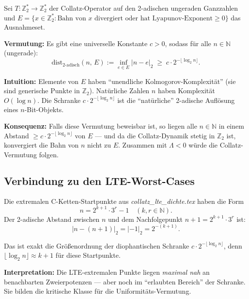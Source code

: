 \documentclass[12pt,a4paper]{article}
\newcommand{\N}{\mathbb{N}}
\newcommand{\Ztwo}{\mathbb{Z}_2}
\begin{document}
\begin{tcolorbox}[konj, title={Uniformitäts-Vermutung (Hauptvermutung dieses Dokuments)}]
Sei $T: \Ztwo^* \to \Ztwo^*$ der Collatz-Operator auf den 2-adischen
ungeraden Ganzzahlen und $E = \{x \in \Ztwo^* : \text{Bahn von } x
\text{ divergiert oder hat Lyapunov-Exponent} \geq 0\}$ das Ausnahmeset.

\medskip
\textbf{Vermutung:} Es gibt eine universelle Konstante $c > 0$, sodass
für alle $n \in \N$ (ungerade):
\[
  \mathrm{dist}_{2\text{-adisch}}(n,\, E)
  := \inf_{e \in E} |n - e|_2
  \;\geq\; c \cdot 2^{-\lfloor\log_2 n\rfloor}.
\]

\medskip
\textbf{Intuition:} Elemente von $E$ haben ``unendliche Kolmogorov-Komplexität''
(sie sind generische Punkte in $\Ztwo$). Natürliche Zahlen $n$ haben
Komplexität $O(\log n)$. Die Schranke $c \cdot 2^{-\lfloor\log_2 n\rfloor}$
ist die ``natürliche'' 2-adische Auflösung eines $n$-Bit-Objekts.

\medskip
\textbf{Konsequenz:} Falls diese Vermutung beweisbar ist, so liegen alle
$n \in \N$ in einem Abstand $\geq c \cdot 2^{-\lfloor\log_2 n\rfloor}$
von $E$ --- und da die Collatz-Dynamik stetig in $\Ztwo$ ist, konvergiert
die Bahn von $n$ nicht zu $E$. Zusammen mit $\Lambda < 0$ würde die
Collatz-Vermutung folgen.
\end{tcolorbox}

\subsection{Verbindung zu den LTE-Worst-Cases}

\begin{tcolorbox}[dynfeld, title={LTE-Extremalpunkte und die diophantische Schranke}]
Die extremalen C-Ketten-Startpunkte aus \textit{collatz\_lte\_dichte.tex}
haben die Form
\[
  n = 2^{k+1} \cdot 3^r - 1
  \quad (k, r \in \N).
\]
Der 2-adische Abstand zwischen $n$ und dem Nachfolgepunkt
$n+1 = 2^{k+1} \cdot 3^r$ ist:
\[
  |n - (n+1)|_2 = |{-1}|_2 = 2^{-(k+1)}.
\]

\medskip
Das ist exakt die Größenordnung der diophantischen Schranke
$c \cdot 2^{-\lfloor\log_2 n\rfloor}$, denn $\lfloor\log_2 n\rfloor \approx k+1$
für diese Startpunkte.

\medskip
\textbf{Interpretation:} Die LTE-extremalen Punkte liegen \emph{maximal
nah} an benachbarten Zweierpotenzen --- aber noch im ``erlaubten Bereich''
der Schranke. Sie bilden die kritische Klasse für die Uniformitäts-Vermutung.
\end{tcolorbox}
\end{document}
